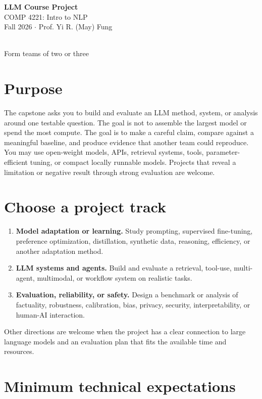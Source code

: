 \documentclass[11pt]{article}
\newcommand{\course}{COMP 4221: Intro to NLP}
\newcommand{\instructor}{Prof. Yi R. (May) Fung}
\begin{document}
\begin{center}
  {\Large\bfseries\color{llmred} LLM Course Project}\\[5pt]
  {\large \course}\\[3pt]
  Fall 2026 \quad $\cdot$ \quad \instructor\\[8pt]
  \colorbox{softgray}{\parbox{0.92\linewidth}{\centering
  \textbf{}\\
  Form teams of two or three}}
\end{center}

\section{Purpose}

The capstone asks you to build and evaluate an LLM method, system, or analysis around one testable question. The goal is not to assemble the largest model or spend the most compute. The goal is to make a careful claim, compare against a meaningful baseline, and produce evidence that another team could reproduce. You may use open-weight models, APIs, retrieval systems, tools, parameter-efficient tuning, or compact locally runnable models. Projects that reveal a limitation or negative result through strong evaluation are welcome.

\section{Choose a project track}

\begin{enumerate}
  \item \textbf{Model adaptation or learning.} Study prompting, supervised fine-tuning, preference optimization, distillation, synthetic data, reasoning, efficiency, or another adaptation method.
  \item \textbf{LLM systems and agents.} Build and evaluate a retrieval, tool-use, multi-agent, multimodal, or workflow system on realistic tasks.
  \item \textbf{Evaluation, reliability, or safety.} Design a benchmark or analysis of factuality, robustness, calibration, bias, privacy, security, interpretability, or human-AI interaction.
\end{enumerate}

Other directions are welcome when the project has a clear connection to large language models and an evaluation plan that fits the available time and resources.

\section{Minimum technical expectations}
\end{document}
